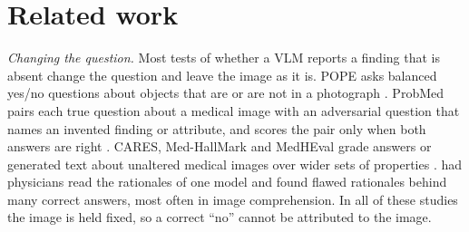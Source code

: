 \section{Related work}\label{sec:related}

\textit{Changing the question.} Most tests of whether a VLM reports a finding that is absent change the question and leave the image as it is. POPE asks balanced yes/no questions about objects that are or are not in a photograph \citep{li2023pope}. ProbMed pairs each true question about a medical image with an adversarial question that names an invented finding or attribute, and scores the pair only when both answers are right \citep{yan2024probmed}. CARES, Med-HallMark and MedHEval grade answers or generated text about unaltered medical images over wider sets of properties \citep{xia2024cares,chen2024medhallmark,chang2024medheval}. \citet{jin2024hidden} had physicians read the rationales of one model and found flawed rationales behind many correct answers, most often in image comprehension. In all of these studies the image is held fixed, so a correct ``no'' cannot be attributed to the image.

